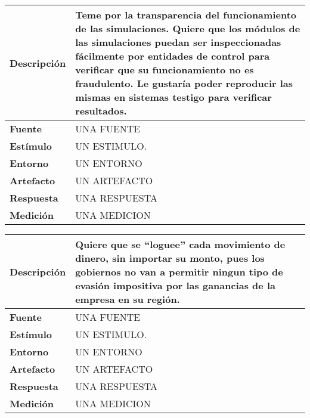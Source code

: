 \begin{center}
  \begin{tabular}{| l | p{10cm} | }
    \hline
  \textbf{Descripción} & Teme por la transparencia del funcionamiento de las simulaciones. Quiere que los módulos de las simulaciones puedan ser inspeccionadas fácilmente por entidades de control para verificar que su funcionamiento no es fraudulento. Le gustaría poder reproducir las mismas en sistemas testigo para verificar resultados.\\  \hline
  \textbf{Fuente} & UNA FUENTE\\  \hline
  \textbf{Estímulo} & UN ESTIMULO.\\  \hline
  \textbf{Entorno} & UN ENTORNO\\  \hline
  \textbf{Artefacto} & UN ARTEFACTO\\  \hline
  \textbf{Respuesta} & UNA RESPUESTA\\  \hline
  \textbf{Medición} & UNA MEDICION\\  \hline
  \end{tabular}
\end{center} 

\begin{center}
  \begin{tabular}{| l | p{10cm} | }
    \hline
  \textbf{Descripción} & Quiere que se “loguee” cada movimiento de dinero, sin importar su monto, pues los gobiernos no van a permitir ningun tipo de evasión impositiva por las ganancias de la empresa en su región. \\  \hline
  \textbf{Fuente} & UNA FUENTE\\  \hline
  \textbf{Estímulo} & UN ESTIMULO.\\  \hline
  \textbf{Entorno} & UN ENTORNO\\  \hline
  \textbf{Artefacto} & UN ARTEFACTO\\  \hline
  \textbf{Respuesta} & UNA RESPUESTA\\  \hline
  \textbf{Medición} & UNA MEDICION\\  \hline
  \end{tabular}
\end{center} 
